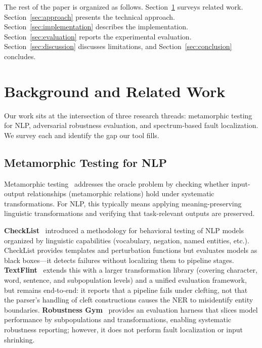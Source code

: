 \documentclass[sigconf,nonacm]{acmart}
\begin{document}
The rest of the paper is organized as follows.
Section~\ref{sec:background} surveys related work.
Section~\ref{sec:approach} presents the technical approach.
Section~\ref{sec:implementation} describes the implementation.
Section~\ref{sec:evaluation} reports the experimental evaluation.
Section~\ref{sec:discussion} discusses limitations, and Section~\ref{sec:conclusion} concludes.

\section{Background and Related Work}\label{sec:background}

Our work sits at the intersection of three research threads: metamorphic testing for NLP, adversarial robustness evaluation, and spectrum-based fault localization.
We survey each and identify the gap our tool fills.

\subsection{Metamorphic Testing for NLP}

Metamorphic testing~\cite{chen1998metamorphic} addresses the oracle problem by checking whether input-output relationships (metamorphic relations) hold under systematic transformations.
For NLP, this typically means applying meaning-preserving linguistic transformations and verifying that task-relevant outputs are preserved.

\textbf{CheckList}~\cite{ribeiro2020beyond} introduced a methodology for behavioral testing of NLP models organized by linguistic capabilities (vocabulary, negation, named entities, etc.).
CheckList provides templates and perturbation functions but evaluates models as black boxes---it detects failures without localizing them to pipeline stages.
\textbf{TextFlint}~\cite{gui2021textflint} extends this with a larger transformation library (covering character, word, sentence, and subpopulation levels) and a unified evaluation framework, but remains end-to-end: it reports that a pipeline fails under clefting, not that the parser's handling of cleft constructions causes the NER to misidentify entity boundaries.
\textbf{Robustness Gym}~\cite{goel2021robustness} provides an evaluation harness that slices model performance by subpopulations and transformations, enabling systematic robustness reporting; however, it does not perform fault localization or input shrinking.
\end{document}
